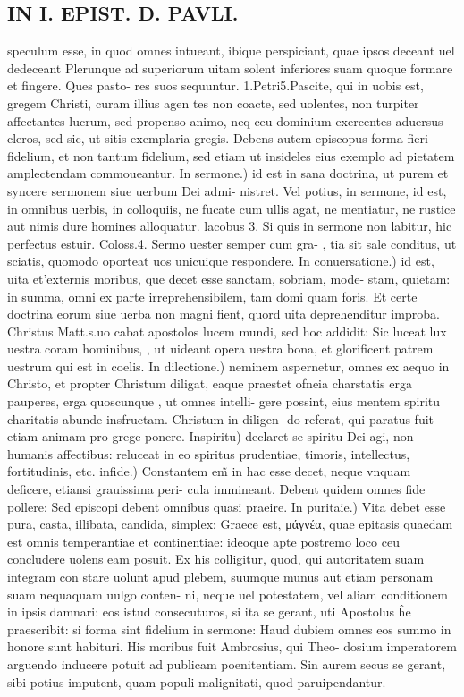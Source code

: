 \documentclass{article}
\begin{document}
\begin{pages}
\section*{IN I. EPIST. D. PAVLI. }
\marginpar{[ p.100 ]}\pstart speculum esse, in quod omnes intueant, ibique perspiciant, quae ipsos deceant uel dedeceant Plerunque ad superiorum uitam solent inferiores suam quoque formare et fingere. Ques pasto- res suos sequuntur. 1.Petri5.Pascite, qui in uobis est, gregem Christi, curam illius agen tes non coacte, sed uolentes, non turpiter affectantes lucrum, sed propenso animo, neq ceu dominium exercentes aduersus cleros, sed sic, ut sitis exemplaria gregis. Debens autem episcopus forma fieri fidelium, et non tantum fidelium, sed etiam ut insideles eius exemplo ad pietatem amplectendam commoueantur.  \pend\pstart In sermone.) id est in sana doctrina, ut purem et syncere sermonem siue uerbum Dei admi- nistret. Vel potius, in sermone, id est, in omnibus uerbis, in colloquiis, ne fucate cum ullis agat, ne mentiatur, ne rustice aut nimis dure homines alloquatur. lacobus 3. Si quis in sermone non labitur, hic perfectus estuir. Coloss.4. Sermo uester semper cum gra- , tia sit sale conditus, ut sciatis, quomodo oporteat uos unicuique respondere.  \pend\pstart In conuersatione.) id est, uita et’externis moribus, que decet esse sanctam, sobriam, mode- stam, quietam: in summa, omni ex parte irreprehensibilem, tam domi quam foris. Et certe doctrina eorum siue uerba non magni fient, quord uita deprehenditur improba. Christus Matt.s.uo cabat apostolos lucem mundi, sed hoc addidit: Sic luceat lux uestra coram hominibus,  , ut uideant opera uestra bona, et glorificent patrem uestrum qui est in coelis.  \pend\pstart In dilectione.) neminem aspernetur, omnes ex aequo in Christo, et propter Christum diligat, eaque praestet ofneia charstatis erga pauperes, erga quoscunque , ut omnes intelli- gere possint, eius mentem spiritu charitatis abunde insfructam. Christum in diligen- do referat, qui paratus fuit etiam animam pro grege ponere.  \pend\pstart Inspiritu) declaret se spiritu Dei agi, non humanis affectibus: reluceat in eo spiritus prudentiae, timoris, intellectus, fortitudinis, etc.  \pend\pstart infide.) Constantem em̃ in hac esse decet, neque vnquam deficere, etiansi grauissima peri- cula immineant. Debent quidem omnes fide pollere: Sed episcopi debent omnibus quasi praeire. In puritaie.) Vita debet esse pura, casta, illibata, candida, simplex: Graece est, μάγνέα, quae epitasis quaedam est omnis temperantiae et continentiae: ideoque apte postremo loco ceu concludere uolens eam posuit. Ex his colligitur, quod, qui autoritatem suam integram con stare uolunt apud plebem, suumque munus aut etiam personam suam nequaquam uulgo conten- ni, neque uel potestatem, vel aliam conditionem in ipsis damnari: eos istud consecuturos, si ita se gerant, uti Apostolus ĥe praescribit: si forma sint fidelium in sermone: Haud dubiem omnes eos summo in honore sunt habituri. His moribus fuit Ambrosius, qui Theo- dosium imperatorem arguendo inducere potuit ad publicam poenitentiam. Sin aurem secus se gerant, sibi potius imputent, quam populi malignitati, quod paruipendantur.  \pend
{}
{}

\end{pages}
\end{document}
